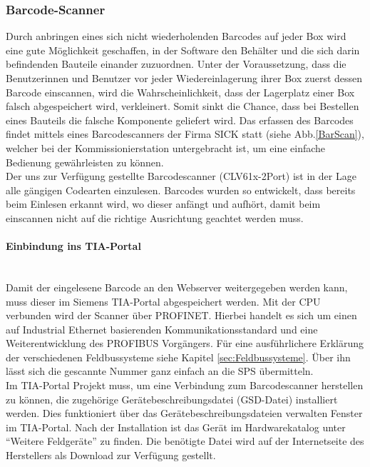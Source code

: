 \subsubsection{Barcode-Scanner} \label{sec:Barcodescanner}
Durch anbringen eines sich nicht wiederholenden Barcodes auf jeder Box wird eine gute Möglichkeit geschaffen, in der Software den Behälter und die sich darin befindenden Bauteile einander zuzuordnen. Unter der Voraussetzung, dass die Benutzerinnen und Benutzer vor jeder Wiedereinlagerung ihrer Box zuerst dessen Barcode einscannen, wird die Wahrscheinlichkeit, dass der Lagerplatz einer Box falsch abgespeichert wird, verkleinert. Somit sinkt die Chance, dass bei Bestellen eines Bauteils die falsche Komponente geliefert wird. Das erfassen des Barcodes findet mittels eines Barcodescanners der Firma SICK statt (siehe Abb.\ref{BarScan}), welcher bei der Kommissionierstation untergebracht ist, um eine einfache Bedienung gewährleisten zu können.\\
Der uns zur Verfügung gestellte Barcodescanner (CLV61x-2Port) ist in der Lage alle gängigen Codearten einzulesen.\cite{Barcodescanner} Barcodes wurden so entwickelt, dass bereits beim Einlesen erkannt wird, wo dieser anfängt und aufhört, damit beim einscannen nicht auf die richtige Ausrichtung geachtet werden muss.



\paragraph{Einbindung ins TIA-Portal \cite{BarScan_Handbuch}}\mbox{}\\
Damit der eingelesene Barcode an den Webserver weitergegeben werden kann, muss dieser im Siemens TIA-Portal abgespeichert werden. Mit der CPU verbunden wird der Scanner über PROFINET. Hierbei handelt es sich um einen auf Industrial Ethernet basierenden Kommunikationsstandard und eine Weiterentwicklung des PROFIBUS Vorgängers. Für eine ausführlichere Erklärung der verschiedenen Feldbussysteme siehe Kapitel \ref{sec:Feldbussysteme}. Über ihn lässt sich die gescannte Nummer ganz einfach an die SPS übermitteln.\\
Im TIA-Portal Projekt muss, um eine Verbindung zum Barcodescanner herstellen zu können, die zugehörige Gerätebeschreibungsdatei (GSD-Datei) installiert werden. Dies funktioniert über das Gerätebeschreibungsdateien verwalten Fenster im TIA-Portal. Nach der Installation ist das Gerät im Hardwarekatalog unter \enquote{Weitere Feldgeräte} zu finden. Die benötigte Datei wird auf der Internetseite des Herstellers als Download zur Verfügung gestellt.

